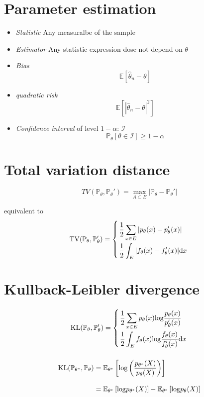\documentclass[12pt,a4paper]{article}
\begin{document}
\section{Parameter estimation}
\begin{itemize}
\item \textit{Statistic} Any measuralbe of the sample
\item \textit{Estimator} Any statistic expression dose not depend on $\theta$
\item \textit{Bias}
\[
\mathbb{E}[\hat{\theta}_n - \theta]
\]
\item \textit{quadratic risk}
\[
\mathbb{E}[|\hat{\theta}_n - \theta|^2]
\]
\item \textit{Confidence interval} of level $1-\alpha$: $\mathcal{I}$
\[
	\mathbb{P}_\theta [\theta \in \mathcal{I}] \geq 1-\alpha
\]

\end{itemize}

\section{Total variation distance}
\[
TV(\mathbb{P}_\theta,\mathbb{P}_\theta') = \max\limits_{A \subset E} |\mathbb{P}_\theta - \mathbb{P}_\theta'|
\]

\noindent equivalent to
\[
\arraycolsep=1.4pt
\def\arraystretch{2}
\mathrm{TV}(\mathbb{P}_\theta,\mathbb{P}_\theta') =\left\{\begin{array}{l}
\displaystyle \frac{1}{2}\sum_{x \in E}|p_\theta (x) - p_\theta' (x)|\\
\displaystyle \frac{1}{2}\int_{E}|f_\theta (x) - f_\theta' (x) |\mathrm{d}x\\
\end{array}
\right.
\]


\section{Kullback-Leibler divergence}
\[
\arraycolsep=1.4pt
\def\arraystretch{2}
\mathrm{KL}(\mathbb{P}_\theta,\mathbb{P}_\theta') =\left\{\begin{array}{l}
\displaystyle \frac{1}{2}\sum_{x \in E}p_\theta(x)\mathrm{log}\frac{p_\theta(x)}{p_\theta'(x)}\\
\displaystyle \frac{1}{2}\int_{E}f_\theta (x)\mathrm{log}\frac{f_\theta (x)}{f_\theta' (x) }\mathrm{d}x\\
\end{array}
\right.
\]

\[
\arraycolsep=1.4pt
\def\arraystretch{2.5}
\begin{array}{rcl}
 \mathrm{KL}(\mathbb{P}_{\theta^*},\mathbb{P}_\theta) & = & \displaystyle \mathbb{E}_{\theta^*}\left[ 
	\mathrm{log}\left(\frac{p_{\theta^*}(X)}{p_{\theta}(X)}\right)
	\right] \\
	& = & \displaystyle \mathbb{E}_{\theta^*}\left[ \mathrm{log}p_{\theta^*}(X)\right] - \mathbb{E}_{\theta^*}\left[ \mathrm{log}p_{\theta}(X)\right] \\
\end{array}
\]
\end{document}
